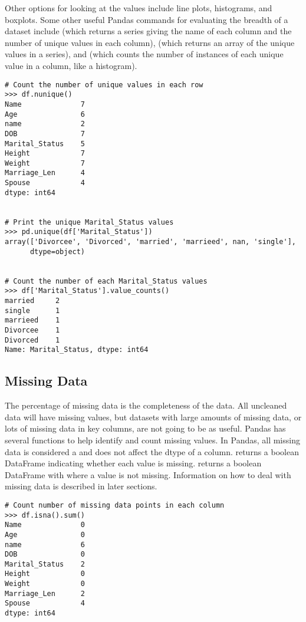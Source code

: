 Other options for looking at the values include line plots, histograms, and boxplots.
Some other useful Pandas commands for evaluating the breadth of a dataset include  (which returns a series giving the name of each column and the number of unique values in each column),  (which returns an array of the unique values in a series), and  (which counts the number of instances of each unique value in a column, like a histogram).

\begin{lstlisting}
# Count the number of unique values in each row
>>> df.nunique()
Name              7
Age               6
name              2
DOB               7
Marital_Status    5
Height            7
Weight            7
Marriage_Len      4
Spouse            4
dtype: int64


# Print the unique Marital_Status values
>>> pd.unique(df['Marital_Status'])
array(['Divorcee', 'Divorced', 'married', 'marrieed', nan, 'single'],
      dtype=object)


# Count the number of each Marital_Status values
>>> df['Marital_Status'].value_counts()
married     2
single      1
marrieed    1
Divorcee    1
Divorced    1
Name: Marital_Status, dtype: int64

\end{lstlisting}

\subsection*{Missing Data}
The percentage of missing data is the completeness of the data. 
All uncleaned data will have missing values, but datasets with large amounts of missing data, or lots of missing data in key columns, are not going to be as useful.
Pandas has several functions to help identify and count missing values.
In Pandas, all missing data is considered a  and does not affect the dtype of a column.
 returns a boolean DataFrame indicating whether each value is missing.
 returns a boolean DataFrame with  where a value is not missing.
Information on how to deal with missing data is described in later sections. 

\begin{lstlisting}
# Count number of missing data points in each column
>>> df.isna().sum()
Name              0
Age               0
name              6
DOB               0
Marital_Status    2
Height            0
Weight            0
Marriage_Len      2
Spouse            4
dtype: int64
\end{lstlisting}


